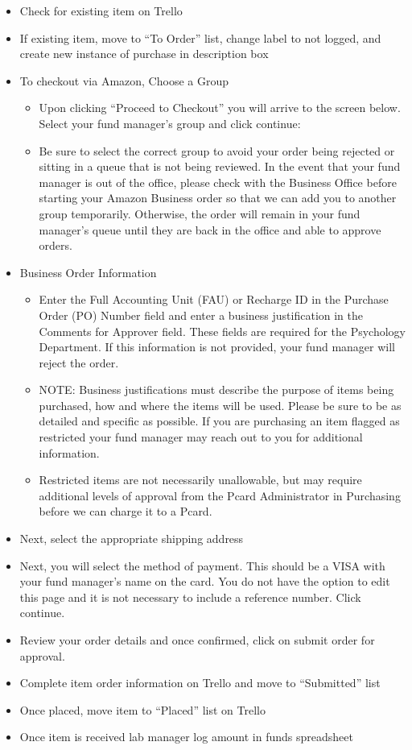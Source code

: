 \documentclass[]{book}
\providecommand{\tightlist}{%
  \setlength{\itemsep}{0pt}\setlength{\parskip}{0pt}}
\begin{document}
\begin{itemize}
\tightlist
\item
  Check for existing item on Trello
\item
  If existing item, move to ``To Order'' list, change label to not logged, and create new instance of purchase in description box
\item
  To checkout via Amazon, Choose a Group

  \begin{itemize}
  \tightlist
  \item
    Upon clicking ``Proceed to Checkout'' you will arrive to the screen below. Select your fund manager's group and click continue:
  \item
    Be sure to select the correct group to avoid your order being rejected or sitting in a queue that is not being reviewed. In the event that your fund manager is out of the office, please check with the Business Office before starting your Amazon Business order so that we can add you to another group temporarily. Otherwise, the order will remain in your fund manager's queue until they are back in the office and able to approve orders.
  \end{itemize}
\item
  Business Order Information

  \begin{itemize}
  \tightlist
  \item
    Enter the Full Accounting Unit (FAU) or Recharge ID in the Purchase Order (PO) Number field and enter a business justification in the Comments for Approver field. These fields are required for the Psychology Department. If this information is not provided, your fund manager will reject the order.
  \item
    NOTE: Business justifications must describe the purpose of items being purchased, how and where the items will be used. Please be sure to be as detailed and specific as possible. If you are purchasing an item flagged as restricted your fund manager may reach out to you for additional information.\\
  \item
    Restricted items are not necessarily unallowable, but may require additional levels of approval from the Pcard Administrator in Purchasing before we can charge it to a Pcard.
  \end{itemize}
\item
  Next, select the appropriate shipping address
\item
  Next, you will select the method of payment. This should be a VISA with your fund manager's name on the card. You do not have the option to edit this page and it is not necessary to include a reference number. Click continue.
\item
  Review your order details and once confirmed, click on submit order for approval.
\item
  Complete item order information on Trello and move to ``Submitted'' list
\item
  Once placed, move item to ``Placed'' list on Trello
\item
  Once item is received lab manager log amount in funds spreadsheet


\end{itemize}
\end{document}
